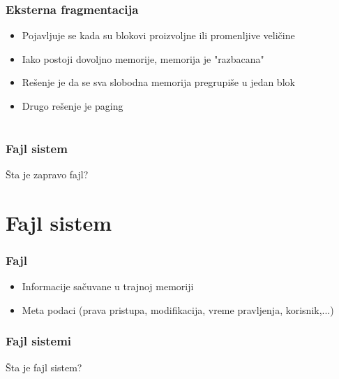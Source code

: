 \documentclass{beamer}
\begin{document}
\begin{frame}
    \frametitle{Eksterna fragmentacija}
    \begin{itemize}
        \item Pojavljuje se kada su blokovi proizvoljne ili promenljive veličine \newline
        \item Iako postoji dovoljno memorije, memorija je "razbacana" \newline
        \item Rešenje je da se sva slobodna memorija pregrupiše u jedan blok \newline
        \item Drugo rešenje je paging
    \end{itemize}
\end{frame}

\section*{}
\subsection*{}
\begin{frame}
    \frametitle{Fajl sistem}
    \begin{center}
        \LARGE{Šta je zapravo fajl?}
    \end{center}
\end{frame}

\section*{Fajl sistem}
\begin{frame}
    \frametitle{Fajl}
    \begin{itemize}
        \item Informacije sačuvane u trajnoj memoriji \newline
        \item Meta podaci (prava pristupa, modifikacija, vreme pravljenja, korisnik,...)
    \end{itemize}
\end{frame}

\begin{frame}
    \frametitle{Fajl sistemi}
    \begin{center}
        \LARGE{Šta je fajl sistem?}
    \end{center}
\end{frame}
\end{document}
